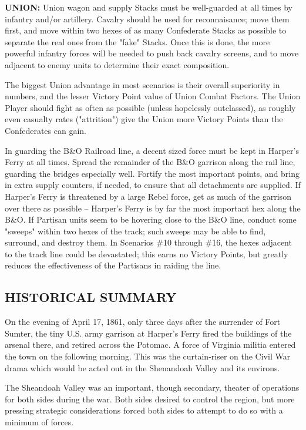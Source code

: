 \textbf{UNION:} Union wagon and supply Stacks must be well-guarded at all
times by infantry and/or artillery. Cavalry should be used for reconnaisance;
move them first, and move within two hexes of as many Confederate Stacks as
possible to separate the real ones from the "fake" Stacks. Once this is done,
the more powerful infantry forces will be needed to push back cavalry screens,
and to move adjacent to enemy units to determine their exact composition.

The biggest Union advantage in most scenarios is their overall superiority in
numbers, and the lesser Victory Point value of Union Combat Factors. The Union
Player should fight as often as possible (unless hopelessly outclassed), as
roughly even casualty rates ("attrition") give the Union more Victory Points
than the Confederates can gain.

In guarding the B\&O Railroad line, a decent sized force must be kept in
Harper's Ferry at all times. Spread the remainder of the B\&O garrison along
the rail line, guarding the bridges especially well. Fortify the most important
points, and bring in extra supply counters, if needed, to ensure that all
detachments are supplied. If Harper's Ferry is threatened by a large Rebel
force, get as much of the garrison over there as possible -- Harper's Ferry is
by far the most important hex along the B\&O. If Partisan units seem to be
hovering close to the B\&O line, conduct some "sweeps" within two hexes of the
track; such sweeps may be able to find, surround, and destroy them. In
Scenarios \#10 through \#16, the hexes adjacent to the track line could be
devastated; this earns no Victory Points, but greatly reduces the effectiveness
of the Partisans in raiding the line.

\subsection*{HISTORICAL SUMMARY}

On the evening of April 17, 1861, only three days after the surrender of Fort
Sumter, the tiny U.S. army garrison at Harper's Ferry fired the buildings of
the arsenal there, and retired across the Potomac. A force of Virginia militia
entered the town on the following morning. This was the curtain-riser on the
Civil War drama which would be acted out in the Shenandoah Valley and its
environs.

The Sheandoah Valley was an important, though secondary, theater of operations
for both sides during the war. Both sides desired to control the region, but
more pressing strategic considerations forced both sides to attempt to do so
with a minimum of forces.

